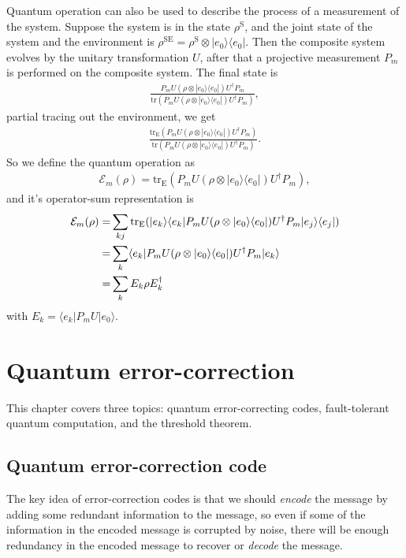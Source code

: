 \documentclass{article}
\newcommand{\ket}[1]{| #1 \rangle}  %
\newcommand{\bra}[1]{\langle #1|} %
\begin{document}
Quantum operation can also be used to describe the process of a measurement of the system. Suppose the system is in the state $\rho^{\text{S}}$, and the joint state of the system and the environment is $\rho^{\text{SE}}=\rho^{\text{S}}\otimes \ket{e_0}\bra{e_0}$. Then the composite system evolves by the unitary transformation $U$, after that a projective measurement $P_m$ is performed on the composite system. The final state is 
\begin{align}
	\frac{P_mU(\rho\otimes \ket{e_0}\bra{e_0})U^{\dagger}P_m}{\text{tr}(P_mU(\rho\otimes \ket{e_0}\bra{e_0})U^{\dagger}P_m)},
\end{align}
partial tracing out the environment, we get
\begin{align}
	\frac{\text{tr}_{\text{E}}(P_mU(\rho\otimes \ket{e_0}\bra{e_0})U^{\dagger}P_m)}{\text{tr}(P_mU(\rho\otimes \ket{e_0}\bra{e_0})U^{\dagger}P_m)}. 
\end{align}
So we define the quantum operation as
\begin{align}
	\mathcal{E}_m(\rho)=\text{tr}_{\text{E}}(P_mU(\rho\otimes \ket{e_0}\bra{e_0})U^{\dagger}P_m),
\end{align}
and it's operator-sum representation is
\begin{align}
	\mathcal{E}_m(\rho)
	=&\sum_{kj}\text{tr}_{\text{E}}(\ket{e_k}\bra{e_k}P_mU(\rho\otimes \ket{e_0}\bra{e_0})U^{\dagger}P_m\ket{e_j}\bra{e_j}) \notag\\
	=&\sum_k \bra{e_k}P_mU(\rho\otimes \ket{e_0}\bra{e_0})U^{\dagger}P_m\ket{e_k} \notag\\
	=& \sum_k E_k \rho E_k^{\dagger}
\end{align}
with $E_k = \bra{e_k}P_mU\ket{e_0}$.






\section{Quantum error-correction}

This chapter covers three topics: quantum error-correcting codes, fault-tolerant quantum computation, and the threshold theorem.

\subsection{Quantum error-correction code}
The key idea of error-correction codes is that we should \textit{encode} the message by adding some redundant information to the message, so even if some of the information in the encoded message is corrupted by noise, there will be enough redundancy in the encoded message to recover or \textit{decode} the message.
\end{document}
